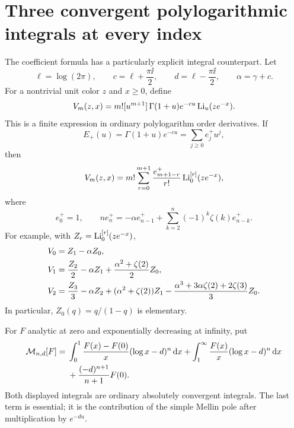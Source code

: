 \section{Three convergent polylogarithmic integrals at every index}\label{tsc:polylog-moments}
The coefficient formula has a particularly explicit integral counterpart.
Let
\begin{equation}\label{tsc:cdalpha}
 \ell=\log(2\pi),\qquad c=\ell+\frac{\pi\ii}{2},\qquad
 d=\ell-\frac{\pi\ii}{2},\qquad \alpha=\gamma+c.
\end{equation}
For a nontrivial unit color $z$ and $x\ge0$, define
\begin{equation}\label{tsc:Vdef}
 V_m(z,x)=m![u^{m+1}]\,
      \Gamma(1+u)e^{-cu}\operatorname{Li}_u(ze^{-x}).
\end{equation}
This is a finite expression in ordinary polylogarithm order derivatives.
If
\[
 E_+(u)=\Gamma(1+u)e^{-cu}=\sum_{j\ge0}e_j^+u^j,
\]
then
\begin{equation}\label{tsc:Vfinite}
 V_m(z,x)=m!\sum_{r=0}^{m+1}\frac{e_{m+1-r}^+}{r!}
                         \operatorname{Li}_0^{[r]}(ze^{-x}),
\end{equation}
where
\begin{equation}\label{tsc:e-recurrence}
 e_0^+=1,\qquad
 n e_n^+=-\alpha e_{n-1}^+
          +\sum_{k=2}^n(-1)^k\zeta(k)e_{n-k}^+.
\end{equation}
For example, with $Z_r=\operatorname{Li}_0^{[r]}(ze^{-x})$,
\begin{align}\label{tsc:Vexamples}
 V_0&=Z_1-\alpha Z_0,\notag\\
 V_1&=\frac{Z_2}{2}-\alpha Z_1+
                  \frac{\alpha^2+\zeta(2)}2Z_0,\notag\\
 V_2&=\frac{Z_3}{3}-\alpha Z_2+
      (\alpha^2+\zeta(2))Z_1
      -\frac{\alpha^3+3\alpha\zeta(2)+2\zeta(3)}3 Z_0.
\end{align}
In particular, $Z_0(q)=q/(1-q)$ is elementary.

For $F$ analytic at zero and exponentially decreasing at infinity, put
\begin{align}\label{tsc:Mfunctional}
 \mathcal M_{n,d}[F]={}&
    \int_0^1\frac{F(x)-F(0)}x(\log x-d)^n\,\mathrm d x
   +\int_1^\infty\frac{F(x)}x(\log x-d)^n\,\mathrm d x\notag\\
 &+\frac{(-d)^{n+1}}{n+1}F(0).
\end{align}
Both displayed integrals are ordinary absolutely convergent integrals.
The last term is essential; it is the contribution of the simple Mellin
pole after multiplication by $e^{-du}$.

